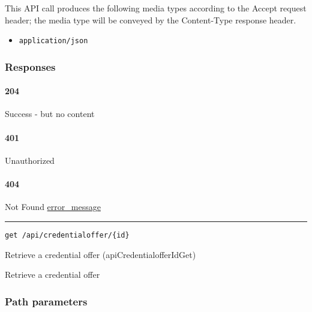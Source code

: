 This API call produces the following media types according to the
{Accept} request header; the media type will be conveyed by the
{Content-Type} response header.

\begin{itemize}
\tightlist
\item
  \texttt{application/json}
\end{itemize}

\hypertarget{responses-118}{%
\subsubsection{Responses}\label{responses-118}}

\hypertarget{section-386}{%
\paragraph{204}\label{section-386}}

Success - but no content \protect\hyperlink{}{}

\hypertarget{section-387}{%
\paragraph{401}\label{section-387}}

Unauthorized \protect\hyperlink{}{}

\hypertarget{section-388}{%
\paragraph{404}\label{section-388}}

Not Found \protect\hyperlink{error_message}{error\_message}

\begin{center}\rule{0.5\linewidth}{\linethickness}\end{center}

\protect\hypertarget{apiCredentialofferIdGet}{}{}

\begin{verbatim}
get /api/credentialoffer/{id}
\end{verbatim}

Retrieve a credential offer ({apiCredentialofferIdGet})

Retrieve a credential offer

\hypertarget{path-parameters-62}{%
\subsubsection{Path parameters}\label{path-parameters-62}}

